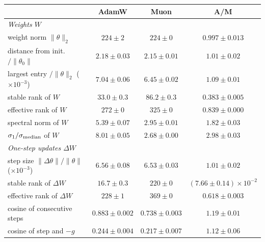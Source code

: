 \begin{center}\small\begin{minipage}{\linewidth}\centering
\captionsetup{type=table}
\caption{All metrics of Step 2 at training loss 1.81: mean $\pm$ half-range over data orders 0--2, and the
ratio AdamW/Muon. If AdamW's values range over $[a_{\min},a_{\max}]$ and Muon's over $[b_{\min},b_{\max}]$, the ratio
ranges over $[a_{\min}/b_{\max},\,a_{\max}/b_{\min}]$, given as midpoint $\pm$ half-width. Rows marked ($\times10^k$)
are in units of $10^k$. Bold: the five ratios farthest from 1 whose range excludes 1.}
\label{tab:app-am}
\footnotesize\setlength{\tabcolsep}{2.5pt}\setlength{\aboverulesep}{0pt}\setlength{\belowrulesep}{0pt}%
\renewcommand{\arraystretch}{1.15}%
\begin{tabular}{@{}l|cc|c@{}}
 & AdamW & Muon & A/M \\
\midrule
\emph{Weights $W$} & & & \\
weight norm $\|\theta\|_2$ & $224 \pm 2$ & $224 \pm 0$ & $0.997 \pm 0.013$ \\
distance from init.\ $/\|\theta_0\|$ & $2.18 \pm 0.03$ & $2.15 \pm 0.01$ & $1.01 \pm 0.02$ \\
largest entry $/\|\theta\|_2$ ($\times10^{-3}$) & $7.04 \pm 0.06$ & $6.45 \pm 0.02$ & $1.09 \pm 0.01$ \\
stable rank of $W$ & $33.0 \pm 0.3$ & $86.2 \pm 0.3$ & {\boldmath\textbf{$0.383 \pm 0.005$}} \\
effective rank of $W$ & $272 \pm 0$ & $325 \pm 0$ & $0.839 \pm 0.000$ \\
spectral norm of $W$ & $5.39 \pm 0.07$ & $2.95 \pm 0.01$ & $1.82 \pm 0.03$ \\
$\sigma_1/\sigma_{\rm median}$ of $W$ & $8.01 \pm 0.05$ & $2.68 \pm 0.00$ & {\boldmath\textbf{$2.98 \pm 0.03$}} \\
\emph{One-step updates $\Delta W$} & & & \\
step size $\|\Delta\theta\|/\|\theta\|$ ($\times10^{-3}$) & $6.56 \pm 0.08$ & $6.53 \pm 0.03$ & $1.01 \pm 0.02$ \\
stable rank of $\Delta W$ & $16.7 \pm 0.3$ & $220 \pm 0$ & {\boldmath\textbf{$(7.66 \pm 0.14){\times}10^{-2}$}} \\
effective rank of $\Delta W$ & $228 \pm 1$ & $369 \pm 0$ & $0.618 \pm 0.003$ \\
cosine of consecutive steps & $0.883 \pm 0.002$ & $0.738 \pm 0.003$ & $1.19 \pm 0.01$ \\
cosine of step and $-g$ & $0.244 \pm 0.004$ & $0.217 \pm 0.007$ & $1.12 \pm 0.06$ \\

\end{tabular}
\end{minipage}
\end{center}
